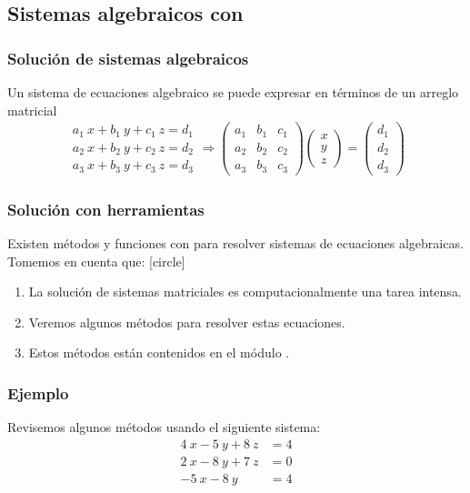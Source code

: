 \subsection{Sistemas algebraicos con \python{}}
\begin{frame}
\frametitle{Solución de sistemas algebraicos}
Un sistema de ecuaciones algebraico se puede expresar en términos de un arreglo matricial
\begin{align*}
\begin{aligned}
a_{1} \: x + b_{1} \: y + c_{1} \: z = d_{1} \\
a_{2} \: x + b_{2} \: y + c_{2} \: z = d_{2} \\
a_{3} \: x + b_{3} \: y + c_{3} \: z = d_{3} 
\end{aligned}
\Longrightarrow
\begin{pmatrix}
a_{1} & b_{1} & c_{1} \\ 
a_{2} & b_{2} & c_{2} \\
a_{3} & b_{3} & c_{3} 
\end{pmatrix}
\begin{pmatrix}
x  \\
y  \\
z
\end{pmatrix} = 
\begin{pmatrix}
d_{1}  \\
d_{2}  \\
d_{3}
\end{pmatrix}
\end{align*}
\end{frame}
\begin{frame}
\frametitle{Solución con herramientas}
Existen métodos y funciones con \python{} para resolver sistemas de ecuaciones algebraicas.
\\
\bigskip
Tomemos en cuenta que:
[circle]
\begin{enumerate}[<+->]
\item La solución de sistemas matriciales es computacionalmente una tarea intensa.
\item Veremos algunos métodos para resolver estas ecuaciones.
\item Estos métodos están contenidos en el módulo .
\end{enumerate}
\end{frame}
\begin{frame}
\frametitle{Ejemplo}
Revisemos algunos métodos usando el siguiente sistema:
\begin{align*}
4 \: x - 5 \: y + 8 \: z &= 4 \\
2 \: x - 8 \: y + 7 \: z &= 0 \\
-5 \: x - 8 \: y &= 4
\end{align*}
\end{frame}
